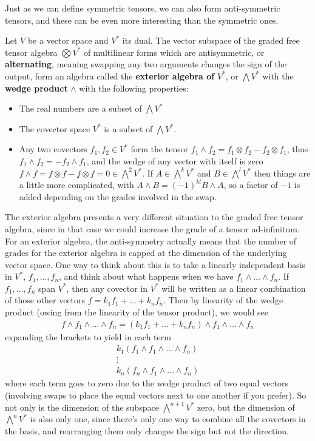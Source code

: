 \documentclass[11pt]{article}
\begin{document}
Just as we can define symmetric tensors, we can also form anti-symmetric tensors, and these can be even more interesting than the symmetric ones.

\begin{definition}
Let $V$ be a vector space and $V^*$ its dual. The vector subspace of the graded free tensor algebra $\bigotimes V^*$ of multilinear forms which are antisymmetric, or \textbf{alternating}, meaning swapping any two arguments changes the sign of the output, form an algebra called the \textbf{exterior algebra of } $V^*$, or $\bigwedge V^*$ with the \textbf{wedge product} $\wedge$ with the following properties: \begin{itemize}
\item The real numbers are a subset of $\bigwedge V^*$
\item The covector space $V^*$ is a subset of $\bigwedge V^*$.
\item Any two covectors $f_1, f_2 \in V^*$ form the tensor $f_1 \wedge f_2 = f_1 \otimes f_2 - f_2 \otimes f_1$, thus $f_1 \wedge f_2 = - f_2 \wedge f_1$, and the wedge of any vector with itself is zero $f \wedge f = f \otimes f - f \otimes f = 0 \in \bigwedge^2 V^*$. If $A \in \bigwedge^k V^*$ and $B \in \bigwedge^l V^*$ then things are a little more complicated, with $A \wedge B = (-1)^{kl} B \wedge A$, so a factor of $-1$ is added depending on the grades involved in the swap.
\end{itemize}
\end{definition}

The exterior algebra presents a very different situation to the graded free tensor algebra, since in that case we could increase the grade of a tensor ad-infinitum. For an exterior algebra, the anti-symmetry actually means that the number of grades for the exterior algebra is capped at the dimension of the underlying vector space. One way to think about this is to take a linearly independent basis in $V^*$, $f_1, \dots, f_n$, and think about what happens when we have $f_1 \wedge \dots \wedge f_n$. If $f_1, \dots, f_n$ span $V^*$, then any covector in $V^*$ will be written as a linear combination of those other vectors $f = k_1 f_1 + \dots + k_n f_n$. Then by linearity of the wedge product (owing from the linearity of the tensor product), we would see \begin{gather*}
f \wedge f_1 \wedge \dots \wedge f_n = (k_1 f_1 + \dots + k_n f_n) \wedge f_1 \wedge \dots \wedge f_n
\end{gather*}
expanding the brackets to yield in each term \begin{gather*}
k_1 (f_1 \wedge f_1 \wedge \dots \wedge f_n) \\
\vdots \\
k_n (f_n \wedge f_1 \wedge \dots \wedge f_n)
\end{gather*}
where each term goes to zero due to the wedge product of two equal vectors (involving swaps to place the equal vectors next to one another if you prefer). So not only is the dimension of the subspace $\bigwedge^{n+1} V^*$ zero, but the dimension of $\bigwedge^n V^*$ is also only one, since there's only one way to combine all the covectors in the basis, and rearranging them only changes the sign but not the direction.
\end{document}
